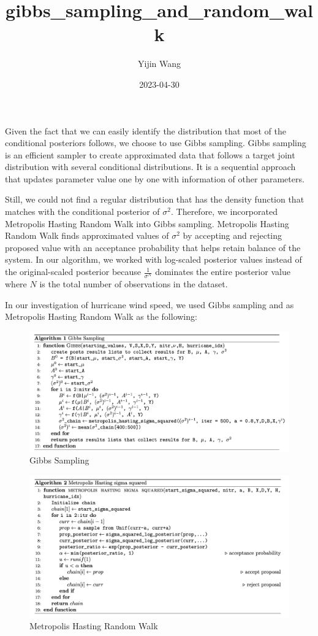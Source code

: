 \documentclass[
]{article}
\title{gibbs\_sampling\_and\_random\_walk}
\author{Yijin Wang}
\date{2023-04-30}
\begin{document}
\maketitle

Given the fact that we can easily identify the distribution that most of
the conditional posteriors follows, we choose to use Gibbs sampling.
Gibbs sampling is an efficient sampler to create approximated data that
follows a target joint distribution with several conditional
distributions. It is a sequential approach that updates parameter value
one by one with information of other parameters.

Still, we could not find a regular distribution that has the density
function that matches with the conditional posterior of \(\sigma^2\).
Therefore, we incorporated Metropolis Hasting Random Walk into Gibbs
sampling. Metropolis Hasting Random Walk finds approximated values of
\(\sigma^2\) by accepting and rejecting proposed value with an
acceptance probability that helps retain balance of the system. In our
algorithm, we worked with log-scaled posterior values instead of the
original-scaled posterior because \(\frac{1}{\sigma^N}\) dominates the
entire posterior value where \(N\) is the total number of observations
in the dataset.

In our investigation of hurricane wind speed, we used Gibbs sampling and
as Metropolis Hasting Random Walk as the following:

\begin{figure}
\centering
\includegraphics{algo_fig/gibbs_sampling.png}
\caption{Gibbs Sampling}
\end{figure}

\begin{figure}
\centering
\includegraphics{algo_fig/random_walk.png}
\caption{Metropolis Hasting Random Walk}
\end{figure}
\end{document}
